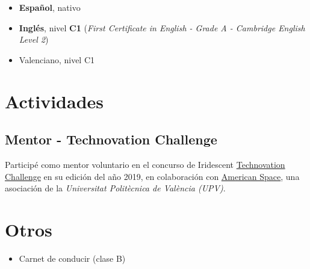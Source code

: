 \documentclass[letterpaper, 12pt, dvipsnames]{article}
\newcommand{\upvFull}{{\upvName} ({\upv})}
\newcommand{\upvName}{Universitat Politècnica de València}
\newcommand{\upv}{UPV}
\newcommand{\fce}{\emph{First Certificate in English - Grade A - Cambridge English Level 2}}
\begin{document}
\begin{itemize}
    \item \textbf{Español}, nativo
    \item \textbf{Inglés}, nivel \textbf{C1} (\fce)
    \item Valenciano, nivel C1
\end{itemize}

\section*{Actividades}

\subsection*{Mentor - Technovation Challenge}

Participé como mentor voluntario en el concurso de Iridescent \href{https://technovationchallenge.org/}{Technovation Challenge} en su edición del año 2019, en colaboración con \href{https://americanspacev.upv.es/}{American Space}, una asociación de la \emph{\upvFull}.

\section*{Otros}

\begin{itemize}
    \item Carnet de conducir (clase B)
\end{itemize}
\end{document}
